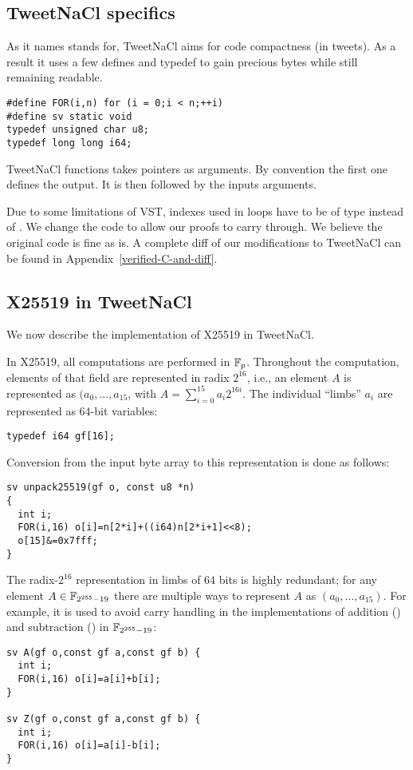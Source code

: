 \subsection{TweetNaCl specifics}
\label{subsec:Number-TweetNaCl}

As it names stands for, TweetNaCl aims for code compactness (in tweets).
As a result it uses a few defines and typedef to gain precious bytes while
still remaining readable.
\begin{lstlisting}[language=Ctweetnacl]
#define FOR(i,n) for (i = 0;i < n;++i)
#define sv static void
typedef unsigned char u8;
typedef long long i64;
\end{lstlisting}

TweetNaCl functions takes pointers as arguments. By convention the first one
defines the output. It is then followed by the inputs arguments.

Due to some limitations of VST, indexes used in  loops have to be
of type  instead of . We change the code to allow our
proofs to carry through. We believe the original code is fine as is.
A complete diff of our modifications to TweetNaCl can be found in
Appendix~\ref{verified-C-and-diff}.

\subsection{X25519 in TweetNaCl}
\label{subsec:X25519-TweetNaCl}

We now describe the implementation of X25519 in TweetNaCl.

In X25519, all computations are performed in $\mathbb{F}_{p}$.
Throughout the computation, elements of that field
are represented in radix $2^{16}$,
i.e., an element $A$ is represented as $(a_0,\dots,a_{15}$,
with $A = \sum_{i=0}^{15}a_i2^{16i}$.
The individual ``limbs'' $a_i$ are represented as
64-bit  variables:
\begin{lstlisting}[language=Ctweetnacl]
typedef i64 gf[16];
\end{lstlisting}

Conversion from the input byte array to this representation is done
as follows:
\begin{lstlisting}[language=Ctweetnacl]
sv unpack25519(gf o, const u8 *n)
{
  int i;
  FOR(i,16) o[i]=n[2*i]+((i64)n[2*i+1]<<8);
  o[15]&=0x7fff;
}
\end{lstlisting}

The radix-$2^{16}$ representation in limbs of $64$ bits is
highly redundant; for any element $A \in \mathbb{F}_{2^{255}-19}$ there are
multiple ways to represent $A$ as $(a_0,\dots,a_{15})$.
For example, it is used to avoid carry handling in
the implementations of addition ()
and subtraction () in $\mathbb{F}_{2^{255}-19}$:
\begin{lstlisting}[language=Ctweetnacl]
sv A(gf o,const gf a,const gf b) {
  int i;
  FOR(i,16) o[i]=a[i]+b[i];
}

sv Z(gf o,const gf a,const gf b) {
  int i;
  FOR(i,16) o[i]=a[i]-b[i];
}
\end{lstlisting}

